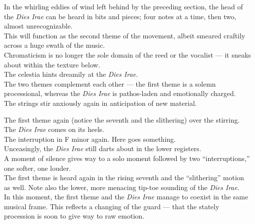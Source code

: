 \documentclass{beamer}
\begin{document}
\begin{frame}
  In the whirling eddies of wind left behind by the preceding section, the head of the \textit{Dies Irae} can be heard in bits and pieces; \pause four notes at a time, \pause then two, almost unrecognizable. 
  \pause \\
  This will function as the second theme of the movement, albeit smeared craftily across a huge swath of the music. 
  \pause \\ 
  Chromaticism is no longer the sole domain of the reed or the vocalist --- it sneaks about within the texture below. 
  \pause \\ 
  The celestia hints dreamily at the \textit{Dies Irae}. 
  \pause \\ 
  The two themes complement each other --- the first theme is a solemn processional, whereas the \textit{Dies Irae} is pathos-laden and emotionally charged. 
  \pause \\ 
  The strings stir anxiously again in anticipation of new material. 
\end{frame} 

\begin{frame} 
  The first theme again (notice the seventh and the slithering) over the stirring. \pause The \textit{Dies Irae} comes on its heels. 
  \pause \\ 
  The interruption in F minor again. Here goes something. 
  \pause \\ 
  Unceasingly, the \textit{Dies Irae} still darts about in the lower registers. 
  \pause \\ 
  A moment of silence gives way to a solo moment followed by two ``interruptions,'' one softer, one louder. 
  \pause \\ 
  The first theme is heard again in the rising seventh and the ``slithering'' motion as well. Note also the lower, more menacing tip-toe sounding of the \textit{Dies Irae}. 
  \pause \\ 
  In this moment, the first theme and the \textit{Dies Irae} manage to coexist in the same musical frame. This reflects a changing of the guard --- that the stately procession is soon to give way to raw emotion. 
\end{frame} 
\end{document}
